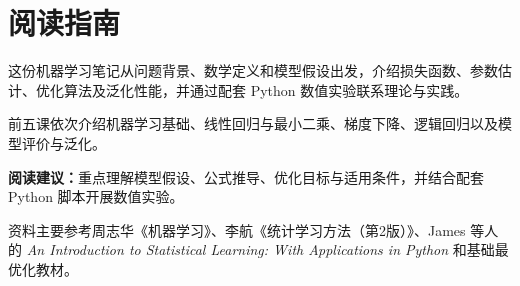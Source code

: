 \section{阅读指南}\label{sec:introduction}

这份机器学习笔记从问题背景、数学定义和模型假设出发，介绍损失函数、参数估计、优化算法及泛化性能，并通过配套 Python 数值实验联系理论与实践。

前五课依次介绍机器学习基础、线性回归与最小二乘、梯度下降、逻辑回归以及模型评价与泛化。

\textbf{阅读建议：}重点理解模型假设、公式推导、优化目标与适用条件，并结合配套 Python 脚本开展数值实验。

资料主要参考周志华《机器学习》、李航《统计学习方法（第2版）》、James 等人的 \textit{An Introduction to Statistical Learning: With Applications in Python} 和基础最优化教材\cite{zhou2016,lihang2019,james2023,liu2020}。
